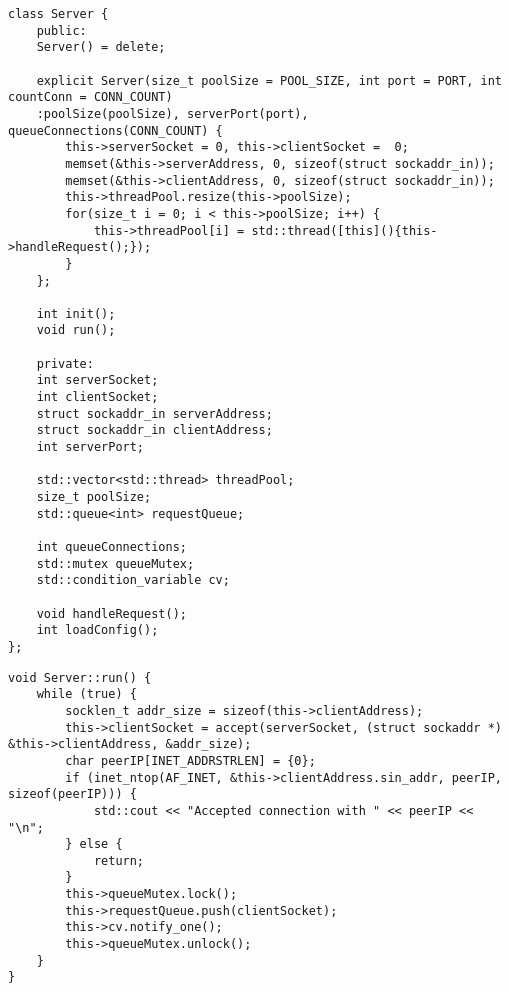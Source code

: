 \begin{center}
    \captionsetup{justification=raggedright,singlelinecheck=off}
    \begin{lstlisting}[label=lst:server_header,caption=Заголовочный файл реализации сервера, включающий в себя создание пула потоков]
class Server {
	public:
	Server() = delete;
	
	explicit Server(size_t poolSize = POOL_SIZE, int port = PORT, int countConn = CONN_COUNT)
	:poolSize(poolSize), serverPort(port), queueConnections(CONN_COUNT) {
		this->serverSocket = 0, this->clientSocket =  0;
		memset(&this->serverAddress, 0, sizeof(struct sockaddr_in));
		memset(&this->clientAddress, 0, sizeof(struct sockaddr_in));
		this->threadPool.resize(this->poolSize);
		for(size_t i = 0; i < this->poolSize; i++) {
			this->threadPool[i] = std::thread([this](){this->handleRequest();});
		}
	};
	
	int init();
	void run();
	
	private:
	int serverSocket;
	int clientSocket;
	struct sockaddr_in serverAddress;
	struct sockaddr_in clientAddress;
	int serverPort;
	
	std::vector<std::thread> threadPool;
	size_t poolSize;
	std::queue<int> requestQueue;
	
	int queueConnections;
	std::mutex queueMutex;
	std::condition_variable cv;
	
	void handleRequest();
	int loadConfig();
};
	\end{lstlisting}
\end{center}

\begin{center}
\captionsetup{justification=raggedright,singlelinecheck=off}
\begin{lstlisting}[label=lst:server_run,caption=Запуск сервера и алгоритм помещения запросов в очередь]
void Server::run() {
	while (true) {
		socklen_t addr_size = sizeof(this->clientAddress);
		this->clientSocket = accept(serverSocket, (struct sockaddr *) &this->clientAddress, &addr_size);
		char peerIP[INET_ADDRSTRLEN] = {0};
		if (inet_ntop(AF_INET, &this->clientAddress.sin_addr, peerIP, sizeof(peerIP))) {
			std::cout << "Accepted connection with " << peerIP << "\n";
		} else {
			return;
		}
		this->queueMutex.lock();
		this->requestQueue.push(clientSocket);
		this->cv.notify_one();
		this->queueMutex.unlock();
	}
}
\end{lstlisting}
\end{center}


